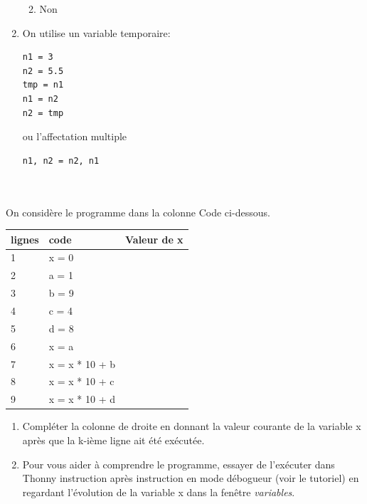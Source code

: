 \documentclass[a4paper,12pt]{article}
\begin{document}
\begin{correction}
\begin{enumerate}
\begin{enumerate}[label=\alph*.]
\begin{center}
\begin{tabular}{|l|p{5cm}|p{5cm}|}
				\end{tabular}
			\end{center}
			\item Non	
		\end{enumerate}
		\item  On utilise un variable temporaire:
			\begin{lstlisting}[numbers=none]
n1 = 3
n2 = 5.5
tmp = n1
n1 = n2
n2 = tmp
			\end{lstlisting}
			ou l'affectation multiple
			\begin{lstlisting}[numbers=none]
n1, n2 = n2, n1
			\end{lstlisting}
	\end{enumerate}

\end{correction}
\finexo



\exo{}  ~\\ 
{}  ~\\ 
 On considère le programme dans la colonne Code ci-dessous.
\begin{center}
	\begin{tabular}{|l|l|p{5cm}|}
		\hline
		\rowcolor[HTML]{EFEFEF} 
		lignes & code & Valeur de x  \\ \hline
		1&          x =  0&              \\ \hline
		2&          a = 1&              \\ \hline
		3&          b = 9&              \\ \hline
		4&          c = 4&              \\ \hline
		5&          d = 8&              \\ \hline
		6&          x = a&              \\ \hline
		7&          x = x * 10 + b&              \\ \hline
		8&          x = x * 10 + c&              \\ \hline
		9&          x = x * 10 + d&              \\ \hline
	\end{tabular}
\end{center}

\begin{enumerate}[label=\alph*)]
	\item Compléter la colonne de droite en donnant la valeur courante de la variable x après que la k-ième  ligne ait été exécutée.
	\item Pour vous aider à comprendre le programme, essayer de l'exécuter dans Thonny instruction après instruction en mode débogueur (voir le tutoriel) en regardant l'évolution de la variable x dans la fenêtre \textit{variables}.
\end{enumerate}
\end{document}

